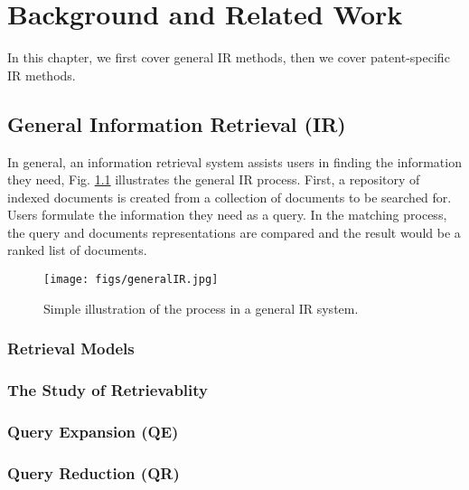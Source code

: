 \chapter{Background and Related Work}
\label{cha:background}
In this chapter, we first cover general IR methods, then we cover patent-specific IR methods.
\section{General Information Retrieval (IR)}
In general, an information retrieval system assists users in finding the information they need, Fig. \ref{fig:generalir} illustrates the general IR process. First, a repository of indexed documents is created from a collection of documents to be searched for. Users formulate the information they need as a query. In the matching process, the query and documents representations are compared and the result would be a ranked list of documents.  
\begin{figure}[htpb]
   \centering
   \texttt{[image: figs/generalIR.jpg]}
   \caption{Simple illustration of the process in a general IR system.}  
   \label{fig:generalir} 
\end{figure}
\FloatBarrier 
\subsection{Retrieval Models}
\label{subsub:retmodels}


\subsection{The Study of Retrievablity}

\label{subsub:retrievability}

\subsection{Query Expansion (QE)}


\subsection{Query Reduction (QR)}

%

